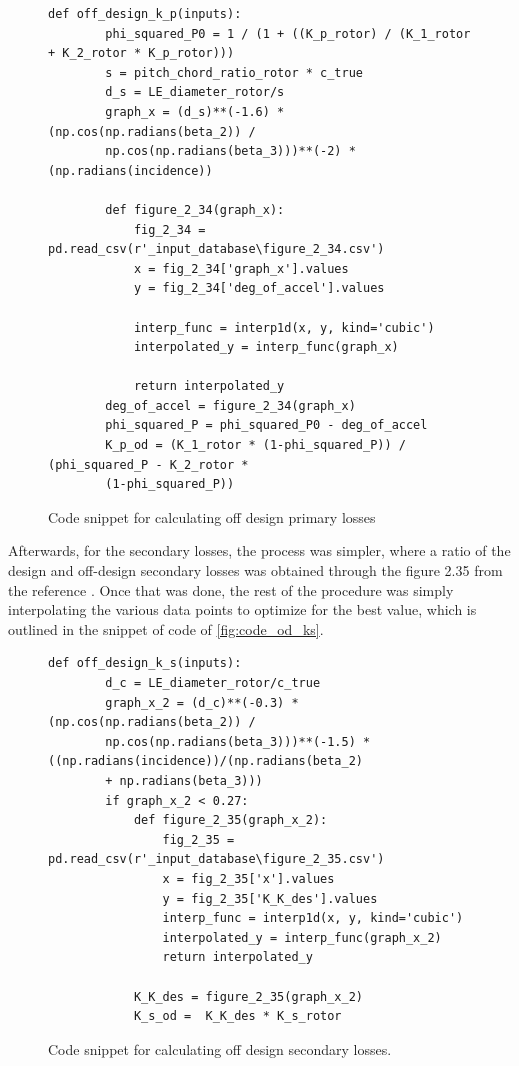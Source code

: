 \documentclass[12pt, letter]{report}
\begin{document}
\begin{figure}[H]
    \begin{verbatim}
def off_design_k_p(inputs):
        phi_squared_P0 = 1 / (1 + ((K_p_rotor) / (K_1_rotor + K_2_rotor * K_p_rotor)))
        s = pitch_chord_ratio_rotor * c_true
        d_s = LE_diameter_rotor/s 
        graph_x = (d_s)**(-1.6) * (np.cos(np.radians(beta_2)) / 
        np.cos(np.radians(beta_3)))**(-2) * (np.radians(incidence))

        def figure_2_34(graph_x):
            fig_2_34 = pd.read_csv(r'_input_database\figure_2_34.csv')
            x = fig_2_34['graph_x'].values
            y = fig_2_34['deg_of_accel'].values

            interp_func = interp1d(x, y, kind='cubic')
            interpolated_y = interp_func(graph_x)

            return interpolated_y
        deg_of_accel = figure_2_34(graph_x)
        phi_squared_P = phi_squared_P0 - deg_of_accel
        K_p_od = (K_1_rotor * (1-phi_squared_P)) / (phi_squared_P - K_2_rotor *
        (1-phi_squared_P))
    \end{verbatim}
    \caption{Code snippet for calculating off design primary losses}
    \label{fig:code_turbine_hub}
\end{figure}

Afterwards, for the secondary losses, the process was simpler, where a ratio of the design and off-design secondary losses was obtained through the figure 2.35 from the reference \cite{moustapha2003}. Once that was done, the rest of the procedure was simply interpolating the various data points to optimize for the best value, which is outlined in the snippet of code of \autoref{fig:code_od_ks}.





\begin{figure}[H]
    \begin{verbatim}
def off_design_k_s(inputs):
        d_c = LE_diameter_rotor/c_true
        graph_x_2 = (d_c)**(-0.3) * (np.cos(np.radians(beta_2)) / 
        np.cos(np.radians(beta_3)))**(-1.5) * ((np.radians(incidence))/(np.radians(beta_2) 
        + np.radians(beta_3)))
        if graph_x_2 < 0.27:
            def figure_2_35(graph_x_2):
                fig_2_35 = pd.read_csv(r'_input_database\figure_2_35.csv')
                x = fig_2_35['x'].values
                y = fig_2_35['K_K_des'].values
                interp_func = interp1d(x, y, kind='cubic')
                interpolated_y = interp_func(graph_x_2)
                return interpolated_y
            
            K_K_des = figure_2_35(graph_x_2)
            K_s_od =  K_K_des * K_s_rotor
    \end{verbatim}
    \caption{Code snippet for calculating off design secondary losses.}
    \label{fig:code_od_ks}
\end{figure}
\end{document}

